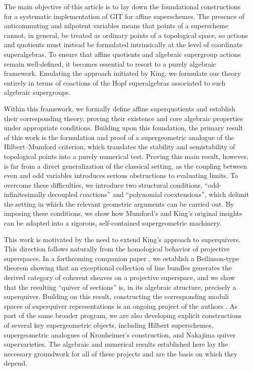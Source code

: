 \documentclass[11pt,a4paper,reqno,noamsfonts]{amsart}
\numberwithin{equation}{section}
\theoremstyle{definition}
\theoremstyle{remark}
\begin{document}
The main objective of this article is to lay down the foundational constructions for a systematic implementation of GIT for affine superschemes. The presence of anticommuting and nilpotent variables means that points of a superscheme cannot, in general, be treated as ordinary points of a topological space, so actions and quotients must instead be formulated intrinsically at the level of coordinate superalgebras. To ensure that affine quotients and algebraic supergroup actions remain well-defined, it becomes essential to resort to a purely algebraic framework. Emulating the approach initiated by King, we formulate our theory entirely in terms of coactions of the Hopf superalgebras associated to such algebraic supergroups.

Within this framework, we formally define affine superquotients and establish their corresponding theory, proving their existence and core algebraic properties under appropriate conditions. Building upon this foundation, the primary result of this work is the formulation and proof of a supergeometric analogue of the Hilbert--Mumford criterion, which translates the stability and semistability of topological points into a purely numerical test. Proving this main result, however, is far from a direct generalization of the classical setting, as the coupling between even and odd variables introduces serious obstructions to evaluating limits. To overcome these difficulties, we introduce two structural conditions, ``odd-infinitesimally decoupled coactions'' and ``polynomial coextensions'', which delimit the setting in which the relevant geometric arguments can be carried out. By imposing these conditions, we show how Mumford's and King's original insights can be adapted into a rigorous, self-contained supergeometric machinery.

This work is motivated by the need to extend King's approach to superquivers. This direction follows naturally from the homological behavior of projective superspaces. In a forthcoming companion paper \cite{QVRHTG2026art1}, we establish a Beilinson-type theorem showing that an exceptional collection of line bundles generates the derived category of coherent sheaves on a projective superspace, and we show that the resulting ``quiver of sections'' is, in its algebraic structure, precisely a superquiver. Building on this result, constructing the corresponding moduli spaces of superquiver representations is an ongoing project of the authors \cite{QVRHTG2026art2}. As part of the same broader program, we are also developing explicit constructions of several key supergeometric objects, including Hilbert superschemes, supergeometric analogues of Kronheimer's construction, and Nakajima quiver supervarieties. The algebraic and numerical results established here lay the necessary groundwork for all of these projects and are the basis on which they depend.
\end{document}
